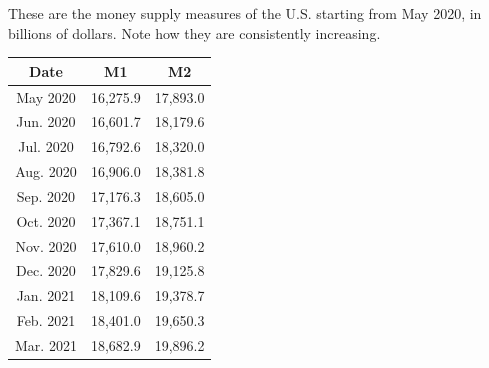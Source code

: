 \documentclass{article}
\begin{document}
      \begin{example}
        These are the money supply measures of the U.S. starting from May 2020, in billions of dollars. Note how they are consistently increasing. 
        \begin{center}
        \begin{tabular}{c|c|c}
          Date & M1 & M2 \\
          \hline
          May 2020 & 16,275.9&17,893.0\\
          Jun. 2020 & 16,601.7&18,179.6\\	
          Jul. 2020 & 16,792.6&18,320.0\\
          Aug. 2020 & 16,906.0&18,381.8\\
          Sep. 2020 & 17,176.3&18,605.0\\
          Oct. 2020 & 17,367.1&18,751.1\\
          Nov. 2020 & 17,610.0&18,960.2\\
          Dec. 2020 & 17,829.6&19,125.8\\
          Jan. 2021 & 18,109.6&19,378.7\\
          Feb. 2021 & 18,401.0&19,650.3\\
          Mar. 2021 & 18,682.9&19,896.2
        \end{tabular}
        \end{center}
      \end{example}
\end{document}
